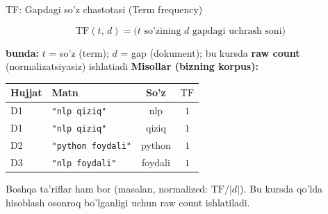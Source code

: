 \documentclass[aspectratio=169,11pt]{beamer}
\newcommand{\bunda}[1]{{\small\textbf{bunda:}\; #1}}
\begin{document}
\begin{frame}{TF: Gapdagi so'z chastotasi (Term frequency)}
  \begin{tcolorbox}[defbox,title=Ta'rif: TF --- atama chastotasi]
    \[
      \mathrm{TF}(t,\, d)
        = \text{(}t\text{ so'zining } d \text{ gapdagi uchrash soni)}
    \]
  \end{tcolorbox}
  \vspace{4pt}
  \bunda{%
    $t$ = so'z (term); $d$ = gap (dokument);
    bu kursda \textbf{raw count} (normalizatsiyasiz) ishlatiadi
  }
  \vspace{5pt}
  \textbf{Misollar (bizning korpus):}
  \begin{center}\small
  \begin{tabular}{llcc}
    \toprule
    Hujjat & Matn & So'z & $\mathrm{TF}$ \\
    \midrule
    D1 & \texttt{"nlp qiziq"} & nlp & $1$ \\
    D1 & \texttt{"nlp qiziq"} & qiziq & $1$ \\
    D2 & \texttt{"python foydali"} & python & $1$ \\
    D3 & \texttt{"nlp foydali"} & foydali & $1$ \\
    \bottomrule
  \end{tabular}
  \end{center}
  \vspace{3pt}
  \footnotesize\color{halfgray}
  Boshqa ta'riflar ham bor (masalan, normalized: $\mathrm{TF}/|d|$).
  Bu kursda qo'lda hisoblash osonroq bo'lganligi uchun raw count ishlatiladi.
\end{frame}
\end{document}
